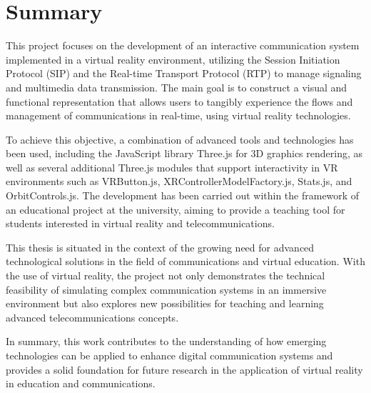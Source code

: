 \documentclass[a4paper, 12pt]{book}
\begin{document}

\chapter*{Summary}

This project focuses on the development of an interactive communication system implemented in a virtual reality environment, 
utilizing the Session Initiation Protocol (SIP) and the Real-time Transport Protocol (RTP) to manage signaling and multimedia data transmission. 
The main goal is to construct a visual and functional representation that allows users to tangibly experience the flows and 
management of communications in real-time, using virtual reality technologies.

\bigskip

To achieve this objective, a combination of advanced tools and technologies has been used, including the JavaScript library Three.js for 3D graphics rendering, 
as well as several additional Three.js modules that support interactivity in VR environments such as VRButton.js, XRControllerModelFactory.js, Stats.js, 
and OrbitControls.js. The development has been carried out within the framework of an educational project at the university, aiming to provide a teaching tool 
for students interested in virtual reality and telecommunications.

\bigskip

This thesis is situated in the context of the growing need for advanced technological solutions in the field of communications and virtual education. 
With the use of virtual reality, the project not only demonstrates the technical feasibility of simulating complex communication systems in an immersive 
environment but also explores new possibilities for teaching and learning advanced telecommunications concepts.

\bigskip

In summary, this work contributes to the understanding of how emerging technologies can be applied to enhance digital communication systems and provides a solid 
foundation for future research in the application of virtual reality in education and communications.

\end{document}
